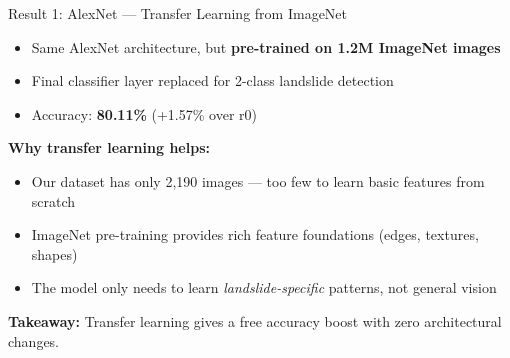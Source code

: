 \documentclass[aspectratio=169]{beamer}
\begin{document}
\begin{frame}{Result 1: AlexNet --- Transfer Learning from ImageNet}
    \begin{itemize}
        \item Same AlexNet architecture, but \textbf{pre-trained on 1.2M ImageNet images}
        \item Final classifier layer replaced for 2-class landslide detection
        \item Accuracy: \textbf{80.11\%} (+1.57\% over r0)
    \end{itemize}

    \vspace{0.5cm}
    \textbf{Why transfer learning helps:}
    \begin{itemize}
        \item Our dataset has only 2,190 images --- too few to learn basic features from scratch
        \item ImageNet pre-training provides rich feature foundations (edges, textures, shapes)
        \item The model only needs to learn \textit{landslide-specific} patterns, not general vision
    \end{itemize}

    \vspace{0.3cm}
    \textbf{Takeaway:} Transfer learning gives a free accuracy boost with zero architectural changes.
\end{frame}
\end{document}
